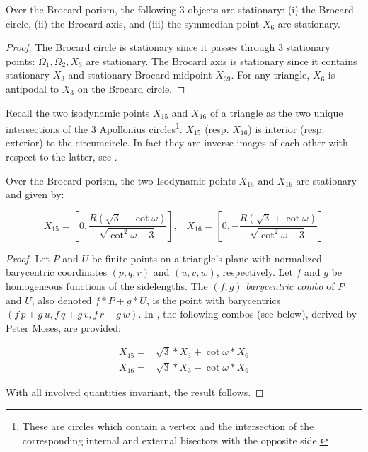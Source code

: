\begin{proposition}
Over the Brocard porism, the following 3 objects are stationary: (i) the Brocard circle, (ii) the Brocard axis, and (iii) the symmedian point $X_6$ are stationary.
\end{proposition}

\begin{proof}
The Brocard circle is stationary since it passes through 3 stationary points: $\Omega_1,\Omega_2,X_3$ are stationary. The Brocard axis is stationary since it contains stationary $X_3$ and stationary Brocard midpoint $X_{39}$. For any triangle, $X_6$ is antipodal to $X_3$ on the Brocard circle.
\end{proof}
 
Recall the two isodynamic points $X_{15}$ and $X_{16}$ of a triangle as the two unique intersections of the 3 Apollonius circles\footnote{These are circles which contain a vertex and the intersection of the corresponding internal and external bisectors with the opposite side.}. $X_{15}$ (resp. $X_{16}$) is interior (resp. exterior) to the circumcircle. In fact they are inverse images of each other with respect to the latter, see \cite[Isodynamic Points]{mw}.

\begin{proposition}
Over the Brocard porism, the two Isodynamic points $X_{15}$ and $X_{16}$ are stationary and given by:

\[
X_{15}=\left[0, \frac{R(\sqrt{3}-\cot{\omega})}{
 \sqrt{\cot^2{\omega}-3}}\right],\;\;\;
 X_{16}=\left[0, -\frac{R(\sqrt{3}+\cot{\omega})}{
 \sqrt{\cot^2{\omega}-3}}\right]
\]
\label{prop:03-x15x16}
\end{proposition}

\begin{proof}
Let $P$ and $U$ be finite points on a triangle's plane with normalized barycentric coordinates $(p,q,r)$ and $(u,v,w)$, respectively. Let $f$ and $g$ be homogeneous functions of the sidelengths. The $(f,g)$ {\em barycentric combo} of $P$ and $U$, also denoted $f*P + g*U$, is the point with barycentrics $(f\,p + g\,u,f\,q + g\,v, f\,r + g\,w)$. In \cite[X(15), X(16)]{etc}, the following combos (see below), derived by Peter Moses, are provided:

\begin{align}
X_{15} =& \sqrt{3}*X_3 + \cot{\omega}*X_6 \label{eqn:combo-x15} \\
X_{16} =& \sqrt{3}*X_3 - \cot{\omega}*X_6 \nonumber
\end{align}
 
 With all involved quantities invariant, the result follows.
\end{proof}

